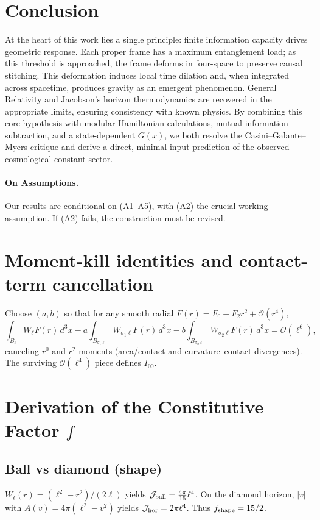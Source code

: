 \documentclass[aps,prd,onecolumn,superscriptaddress,nofootinbib]{revtex4-2}
\begin{document}
\section{Conclusion}
At the heart of this work lies a single principle: finite information capacity drives geometric response. Each proper frame has a maximum entanglement load; as this threshold is approached, the frame deforms in four-space to preserve causal stitching. This deformation induces local time dilation and, when integrated across spacetime, produces gravity as an emergent phenomenon. General Relativity and Jacobson’s horizon thermodynamics are recovered in the appropriate limits, ensuring consistency with known physics. By combining this core hypothesis with modular-Hamiltonian calculations, mutual-information subtraction, and a state-dependent \(G(x)\), we both resolve the Casini–Galante–Myers critique and derive a direct, minimal-input prediction of the observed cosmological constant sector.

\paragraph{On Assumptions.}
Our results are conditional on (A1–A5), with (A2) the crucial working assumption. If (A2) fails, the construction must be revised.

\appendix

\section{Moment-kill identities and contact-term cancellation}
\label{app:MI-momentkill}
Choose \((a,b)\) so that for any smooth radial \(F(r)=F_0+F_2 r^2+\mathcal O(r^4)\),
\begin{equation}
\int_{B_\ell}\!W_\ell F(r)\,d^3x - a\!\int_{B_{\sigma_1\ell}}\!W_{\sigma_1\ell}F(r)\,d^3x - b\!\int_{B_{\sigma_2\ell}}\!W_{\sigma_2\ell}F(r)\,d^3x = \mathcal O(\ell^6),
\end{equation}
canceling \(r^0\) and \(r^2\) moments (area/contact and curvature–contact divergences). The surviving \(\mathcal O(\ell^4)\) piece defines \(I_{00}\).

\section{Derivation of the Constitutive Factor \(f\)}
\label{app:f-normalization}
\subsection{Ball vs diamond (shape)}
\(W_\ell(r)=(\ell^2-r^2)/(2\ell)\) yields \(\mathcal J_{\rm ball}=\frac{4\pi}{15}\ell^4\).
On the diamond horizon, \(|v|\) with \(A(v)=4\pi(\ell^2-v^2)\) yields \(\mathcal J_{\rm hor}=2\pi\ell^4\).
Thus \(f_{\rm shape}=15/2\).
\end{document}
